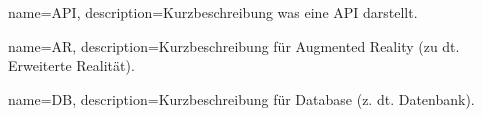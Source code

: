 {
	name=API,
	description={Kurzbeschreibung was eine API darstellt.}
}


{
	name=AR,
	description={Kurzbeschreibung für Augmented Reality (zu dt. Erweiterte Realität).}
}


{
	name=DB,
	description={Kurzbeschreibung für Database (z. dt. Datenbank).}
}
